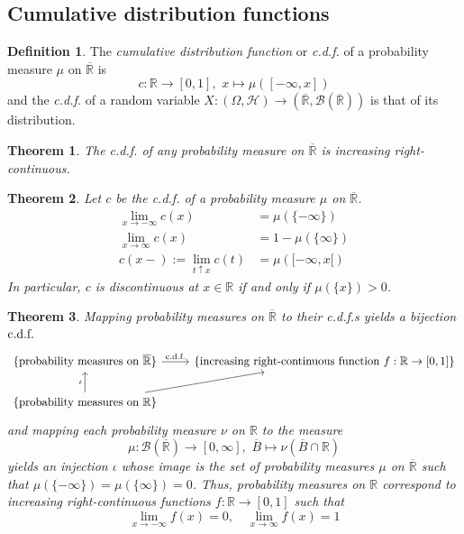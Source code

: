 \documentclass[11pt, a4paper, openany]{book}
\newtheorem{thm}{Theorem}\newtheorem{lem}{Lemma}\newtheorem{crl}{Corollary}
\theoremstyle{definition}
\newtheorem{define}{Definition}\newtheorem{exam}{Example}\newtheorem{remark}{Remark}
\newcommand{\er}{\overline{\mathbb{R}}}
\begin{document}
\subsection{Cumulative distribution functions}
    \begin{define}
        The \textit{cumulative distribution function} or \textit{c.d.f.} of a probability measure $\mu$ on $\er$ is
        \[
            c:\mathbb{R}\rightarrow [0,1],\,\,x\mapsto \mu([-\infty,x])
        \]
        and the \textit{c.d.f.} of a random variable $X:(\Omega,\mathscr{H})\rightarrow (\er,\mathscr{B}(\er))$ is that of its distribution.
    \end{define}
    \begin{thm}
        The c.d.f. of any probability measure on $\er$ is increasing right-continuous.
    \end{thm}
    \begin{thm}\label{limits of c.d.f.}
        Let $c$ be the c.d.f. of a probability measure $\mu$ on $\er$.
        \begin{align*}
            \lim_{x\to -\infty}c(x)&=\mu(\{-\infty\})\\
            \lim_{x\to\infty}c(x)&=1-\mu(\{\infty\})\\
            c(x-):=\lim_{t\uparrow x}c(t)&=\mu([-\infty,x[)
        \end{align*}
        In particular, $c$ is discontinuous at $x\in\mathbb{R}$ if and only if $\mu(\{x\})>0$.
    \end{thm}
    \begin{thm}
        Mapping probability measures on $\er$ to their c.d.f.s yields a bijection $\textup{c.d.f.}$
        \[
            \begin{tikzcd}
                \{\text{probability measures on }\er\} \ar[r, "\textup{c.d.f.}"] & \{\text{increasing right-continuous function }f:\mathbb{R}\rightarrow [0,1]\}\\
                \{\text{probability measures on }\mathbb{R}\} \ar[u, "\iota"] \ar[ur]
            \end{tikzcd}
        \]
        and mapping each probability measure $\nu$ on $\mathbb{R}$ to the measure
        \[
            \mu:\mathscr{B}(\er)\rightarrow [0,\infty],\,\,\overline{B}\mapsto \nu(\overline{B}\cap\mathbb{R})
        \]
        yields an injection $\iota$ whose image is the set of probability measures $\mu$ on $\er$ such that $\mu(\{-\infty\})=\mu(\{\infty\})=0$. Thus, probability measures on $\mathbb{R}$ correspond to increasing right-continuous functions $f:\mathbb{R}\rightarrow [0,1]$ such that
        \[
            \lim_{x\to-\infty}f(x)=0,\quad\lim_{x\to\infty}f(x)=1
        \]
    \end{thm}
\end{document}
